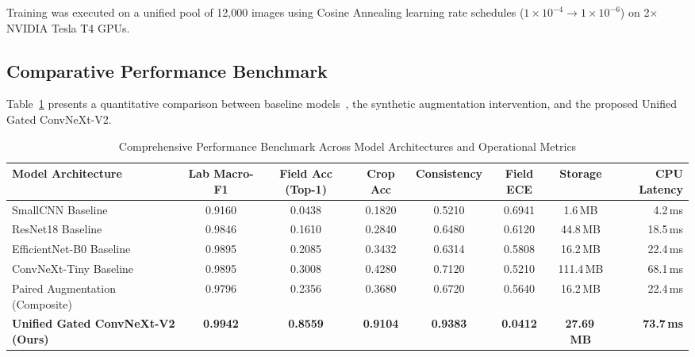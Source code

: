 \documentclass[conference]{IEEEtran}
\begin{document}
Training was executed on a unified pool of 12,000 images using Cosine Annealing learning rate schedules ($1\times10^{-4} \to 1\times10^{-6}$) on 2$\times$ NVIDIA Tesla T4 GPUs.

\subsection{Comparative Performance Benchmark}
Table~\ref{tab:main-results} presents a quantitative comparison between baseline models~\cite{he2016deep, tan2019efficientnet}, the synthetic augmentation intervention, and the proposed Unified Gated ConvNeXt-V2.

\begin{table}[t]
\centering
\caption{Comprehensive Performance Benchmark Across Model Architectures and Operational Metrics}
\label{tab:main-results}
\begin{tabularx}{\textwidth}{@{}lccccccr@{}}
\toprule
\textbf{Model Architecture} & \textbf{Lab Macro-F1} & \textbf{Field Acc (Top-1)} & \textbf{Crop Acc} & \textbf{Consistency} & \textbf{Field ECE} & \textbf{Storage} & \textbf{CPU Latency} \\
\midrule
SmallCNN Baseline & 0.9160 & 0.0438 & 0.1820 & 0.5210 & 0.6941 & 1.6\,MB & 4.2\,ms \\
ResNet18 Baseline~\cite{he2016deep} & 0.9846 & 0.1610 & 0.2840 & 0.6480 & 0.6120 & 44.8\,MB & 18.5\,ms \\
EfficientNet-B0 Baseline~\cite{tan2019efficientnet} & 0.9895 & 0.2085 & 0.3432 & 0.6314 & 0.5808 & 16.2\,MB & 22.4\,ms \\
ConvNeXt-Tiny Baseline & 0.9895 & 0.3008 & 0.4280 & 0.7120 & 0.5210 & 111.4\,MB & 68.1\,ms \\
\midrule
Paired Augmentation (Composite) & 0.9796 & 0.2356 & 0.3680 & 0.6720 & 0.5640 & 16.2\,MB & 22.4\,ms \\
\midrule
\textbf{Unified Gated ConvNeXt-V2 (Ours)} & \textbf{0.9942} & \textbf{0.8559} & \textbf{0.9104} & \textbf{0.9383} & \textbf{0.0412} & \textbf{27.69\,MB} & \textbf{73.7\,ms} \\
\bottomrule
\end{tabularx}
\end{table}
\end{document}
